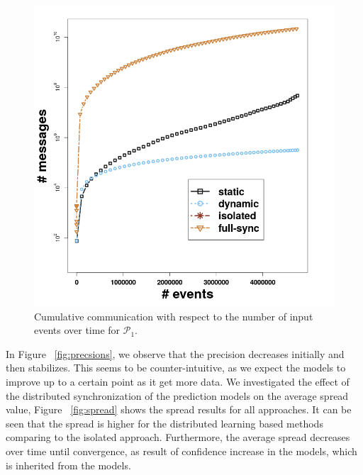 \begin{center}
	
	\begin{figure}[H]
		\centering
		\includegraphics[width=\textwidth,height=.62\textheight]{chapters/figures/synopses/p1_messages_100_2_08.png}
		
		\caption{Cumulative communication with respect to the number of input events over time for $\mathcal{P}_1$.}
		\label{fig:comm}
	\end{figure}
\end{center}


\par In Figure ~\ref{fig:precsions}, we observe that the precision decreases initially and then stabilizes. This seems to be counter-intuitive, as we expect the models to improve up to a certain point as it get more data. We  investigated the effect of the distributed synchronization of the prediction models on the average spread value, Figure  ~\ref{fig:spread}  shows the spread results for all approaches. It can be seen that the spread is higher for the distributed learning based methods comparing to the isolated approach. Furthermore, the average spread decreases over time until convergence, as result of confidence increase in the models, which is inherited from the \pmcmr models. 

